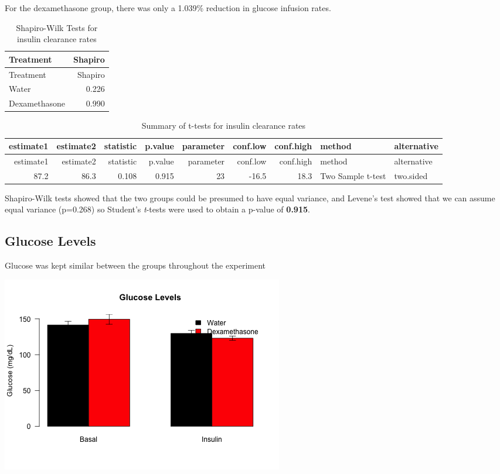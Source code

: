 \documentclass[]{article}
\begin{document}
For the dexamethasone group, there was only a 1.039\% reduction in
glucose infusion rates.

\begin{longtable}[]{@{}lr@{}}
\caption{Shapiro-Wilk Tests for insulin clearance rates}\tabularnewline
\toprule
Treatment & Shapiro\tabularnewline
\midrule
\endfirsthead
\toprule
Treatment & Shapiro\tabularnewline
\midrule
\endhead
Water & 0.226\tabularnewline
Dexamethasone & 0.990\tabularnewline
\bottomrule
\end{longtable}

\begin{longtable}[]{@{}rrrrrrrll@{}}
\caption{Summary of t-tests for insulin clearance rates}\tabularnewline
\toprule
estimate1 & estimate2 & statistic & p.value & parameter & conf.low &
conf.high & method & alternative\tabularnewline
\midrule
\endfirsthead
\toprule
estimate1 & estimate2 & statistic & p.value & parameter & conf.low &
conf.high & method & alternative\tabularnewline
\midrule
\endhead
87.2 & 86.3 & 0.108 & 0.915 & 23 & -16.5 & 18.3 & Two Sample t-test &
two.sided\tabularnewline
\bottomrule
\end{longtable}

Shapiro-Wilk tests showed that the two groups could be presumed to have
equal variance, and Levene's test showed that we can assume equal
variance (p=0.268) so Student's \emph{t}-tests were used to obtain a
p-value of \textbf{0.915}.

\subsection{Glucose Levels}\label{glucose-levels}

Glucose was kept similar between the groups throughout the experiment

\includegraphics{figures/glucose-barplot-hfd-1.png}
\end{document}
